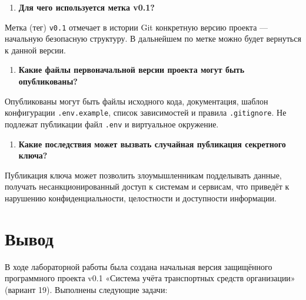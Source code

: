 \documentclass[12pt,a4paper]{article}
\begin{document}
\begin{enumerate}
\item \textbf{Для чего используется метка v0.1?}
\end{enumerate}
Метка (тег) \texttt{v0.\allowbreak{}1} отмечает в истории Git конкретную версию проекта — начальную безопасную структуру. В дальнейшем по метке можно будет вернуться к данной версии.

\begin{enumerate}
\item \textbf{Какие файлы первоначальной версии проекта могут быть опубликованы?}
\end{enumerate}
Опубликованы могут быть файлы исходного кода, документация, шаблон конфигурации \texttt{.\allowbreak{}env.\allowbreak{}example}, список зависимостей и правила \texttt{.\allowbreak{}gitignore}. Не подлежат публикации файл \texttt{.\allowbreak{}env} и виртуальное окружение.

\begin{enumerate}
\item \textbf{Какие последствия может вызвать случайная публикация секретного ключа?}
\end{enumerate}
Публикация ключа может позволить злоумышленникам подделывать данные, получать несанкционированный доступ к системам и сервисам, что приведёт к нарушению конфиденциальности, целостности и доступности информации.

\section{Вывод}

В ходе лабораторной работы была создана начальная версия защищённого программного проекта v0.1 «Система учёта транспортных средств организации» (вариант 19). Выполнены следующие задачи:
\end{document}
